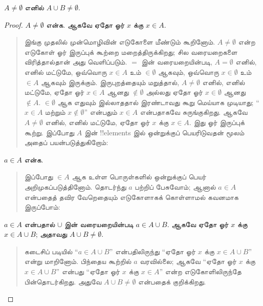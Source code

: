 \documentclass[../../../include/open-logic-section]{subfiles}
\begin{document}
\begin{prop}
$A \neq \emptyset$ எனில் $A \cup B \neq \emptyset$.
\end{prop}

\begin{proof}
  $A \neq \emptyset$ என்க. ஆகவே ஏதோ ஓர் $x$
  க்கு $x \in A$.
  \begin{quote}
    இங்கு முதலில் முன்மொழிவின் எடுகோளை மீண்டும் கூறினோம்.
    $A \neq \emptyset$ என்ற எடுகோள் ஓர் இருப்புக்
    கூற்றை மறைத்திருக்கிறது; சில வரையறைகளை விரித்தால்தான்
    அது வெளிப்படும். $=$ இன் வரையறையின்படி,
    $A = \emptyset$ எனில், எனில் மட்டுமே, ஒவ்வொரு
    $x \in A$ உம் $\in \emptyset$ ஆகவும்,
    ஒவ்வொரு $x \in \emptyset$ உம் $\in A$ ஆகவும்
    இருக்கும். இருபுறத்தையும் மறுத்தால்,
    $A \neq \emptyset$ எனில், எனில் மட்டுமே,
    ஏதோ ஓர் $x \in A$ ஆனது $\notin \emptyset$
    அல்லது ஏதோ ஓர் $x \in \emptyset$ ஆனது
    $\notin A$. $\in \emptyset$ ஆக எதுவும்
    இல்லாததால் இரண்டாவது கூறு மெய்யாக முடியாது;
    ``$x \in A$ மற்றும் $x \notin \emptyset$''
    என்பதும் $x \in A$ என்பதாகவே சுருங்குகிறது.
    ஆகவே $A \neq \emptyset$ எனில், எனில் மட்டுமே,
    ஏதோ ஓர் $x$ க்கு $x \in A$. இது ஓர் இருப்புக்
    கூற்று. இப்போது $A$ இன் !!{element}s இல்
    ஒன்றுக்குப் பெயரிடுவதன் மூலம் அதைப் பயன்படுத்துகிறோம்:
  \end{quote}
  $a \in A$ என்க.
  \begin{quote}
    இப்போது $\in A$ ஆக உள்ள பொருள்களில் ஒன்றுக்குப்
    பெயர் அறிமுகப்படுத்தினோம். தொடர்ந்து $a$ பற்றிப்
    பேசுவோம்; ஆனால் $a \in A$ என்பதைத் தவிர வேறெதையும்
    எடுகோளாகக் கொள்ளாமல் கவனமாக இருப்போம்:
  \end{quote}
  $a \in A$ என்பதால் $\cup$ இன் வரையறையின்படி
  $a \in A \cup B$. ஆகவே ஏதோ ஓர் $x$ க்கு
  $x \in A \cup B$; அதாவது $A \cup B \neq \emptyset$.
  \begin{quote}
    கடைசிப் படியில் ``$a \in A \cup B$'' என்பதிலிருந்து
    ``ஏதோ ஓர் $x$ க்கு $x \in A \cup B$'' என்று
    மாறினோம். பிந்தைய கூற்றில் $a$ வரவில்லை; ஆகவே
    ``ஏதோ ஓர் $x$ க்கு $x \in A \cup B$'' என்பது
    ``ஏதோ ஓர் $x$ க்கு $x \in A$'' என்ற
    எடுகோளிலிருந்தே பின்தொடர்கிறது. அதுவே
    $A \cup B \neq \emptyset$ என்பதைக் குறிக்கிறது.
  \end{quote}
\end{proof}
\end{document}
